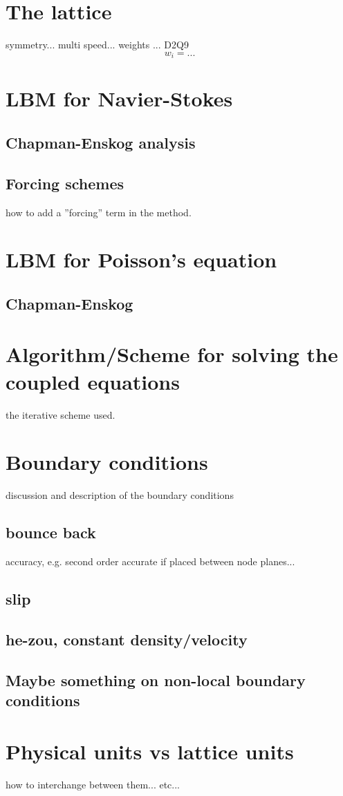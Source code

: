 

\section{The lattice}\label{sec:lbm:lattice}
symmetry... multi speed... weights ... D2Q9
\begin{equation}\label{eq:lbm:weights}
w_i = ...
\end{equation}





\section{LBM for Navier-Stokes}
\subsection{Chapman-Enskog analysis}

\subsection{Forcing schemes}
how to add a ''forcing'' term in the method.

\section{LBM for Poisson's equation}
\subsection{Chapman-Enskog}

\section{Algorithm/Scheme for solving the coupled equations}
the iterative scheme used.

\section{Boundary conditions}
discussion and description of the boundary conditions
\subsection{bounce back}
accuracy, e.g. second order accurate if placed between node planes...
\subsection{slip}
\subsection{he-zou, constant density/velocity}
\subsection{Maybe something on non-local boundary conditions}

\section{Physical units vs lattice units}
how to interchange between them... etc...

\section{}
